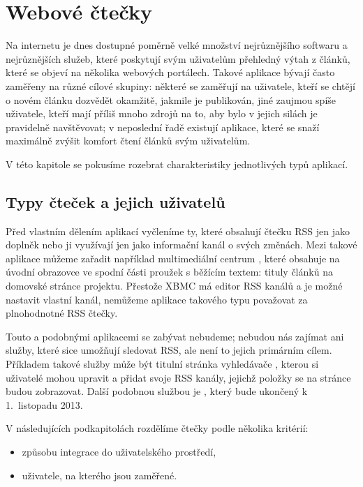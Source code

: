 \chapter{Webové čtečky}

Na internetu je dnes dostupné poměrně velké množství nejrůznějšího softwaru a nejrůznějších služeb, které poskytují svým uživatelům přehledný výtah z článků, které se objeví na několika webových portálech.
Takové aplikace bývají často zaměřeny na různé cílové skupiny: některé se zaměřují na uživatele, kteří se chtějí o novém článku dozvědět okamžitě, jakmile je publikován, jiné zaujmou spíše uživatele, kteří mají příliš mnoho zdrojů na to, aby bylo v jejich silách je pravidelně navštěvovat; v neposlední řadě existují aplikace, které se snaží maximálně zvýšit komfort čtení článků svým uživatelům.

V této kapitole se pokusíme rozebrat charakteristiky jednotlivých typů aplikací.

\section{Typy čteček a jejich uživatelů}

Před vlastním dělením aplikací vyčleníme ty, které obsahují čtečku RSS jen jako doplněk nebo ji využívají jen jako informační kanál o svých změnách.
Mezi takové aplikace můžeme zařadit například multimediální centrum , které obsahuje na úvodní obrazovce ve spodní části proužek s běžícím textem: tituly článků na domovské stránce projektu.
Přestože XBMC má editor RSS kanálů a je možné nastavit vlastní kanál, nemůžeme aplikace takového typu považovat za plnohodnotné RSS čtečky.

Touto a podobnými aplikacemi se zabývat nebudeme; nebudou nás zajímat ani služby, které sice umožňují sledovat RSS, ale není to jejich primárním cílem.
Příkladem takové služby může být titulní stránka vyhledávače , kterou si uživatelé mohou upravit a přidat svoje RSS kanály, jejichž položky se na stránce budou zobrazovat.
Další podobnou službou je , který bude ukončený k 1.~listopadu 2013.

\bigskip

V následujících podkapitolách rozdělíme čtečky podle několika kritérií:
\begin{itemize}
	\item způsobu integrace do uživatelského prostředí,
	\item uživatele, na kterého jsou zaměřené.
\end{itemize}

